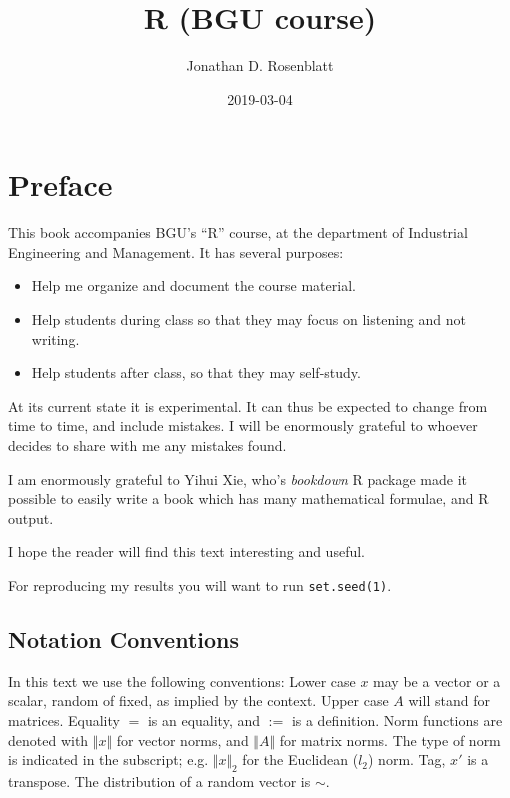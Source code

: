 \documentclass[]{book}
\title{R (BGU course)}
\author{Jonathan D. Rosenblatt}
\date{2019-03-04}
\providecommand{\tightlist}{%
  \setlength{\itemsep}{0pt}\setlength{\parskip}{0pt}}
\theoremstyle{definition}
\theoremstyle{definition}
\theoremstyle{definition}
\theoremstyle{remark}
\begin{document}
\maketitle

{
\setcounter{tocdepth}{1}
\tableofcontents
}
\chapter{Preface}\label{preface}

This book accompanies BGU's ``R'' course, at the department of
Industrial Engineering and Management. It has several purposes:

\begin{itemize}
\tightlist
\item
  Help me organize and document the course material.
\item
  Help students during class so that they may focus on listening and not
  writing.
\item
  Help students after class, so that they may self-study.
\end{itemize}

At its current state it is experimental. It can thus be expected to
change from time to time, and include mistakes. I will be enormously
grateful to whoever decides to share with me any mistakes found.

I am enormously grateful to Yihui Xie, who's \emph{bookdown} R package
made it possible to easily write a book which has many mathematical
formulae, and R output.

I hope the reader will find this text interesting and useful.

For reproducing my results you will want to run \texttt{set.seed(1)}.

\section{Notation Conventions}\label{notation-conventions}

In this text we use the following conventions: Lower case \(x\) may be a
vector or a scalar, random of fixed, as implied by the context. Upper
case \(A\) will stand for matrices. Equality \(=\) is an equality, and
\(:=\) is a definition. Norm functions are denoted with
\(\Vert x \Vert\) for vector norms, and \(\Vert A \Vert\) for matrix
norms. The type of norm is indicated in the subscript; e.g.
\(\Vert x \Vert_2\) for the Euclidean (\(l_2\)) norm. Tag, \(x'\) is a
transpose. The distribution of a random vector is \(\sim\).
\end{document}
